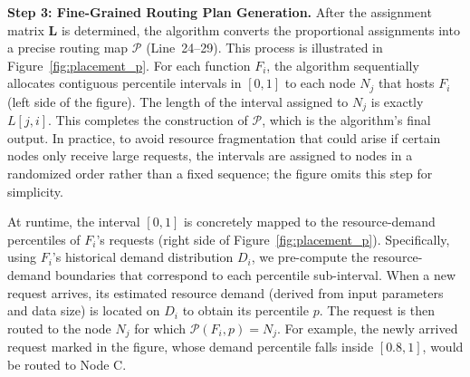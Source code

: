 \textbf{Step 3: Fine-Grained Routing Plan Generation.}
After the assignment matrix $\mathbf{L}$ is determined, the algorithm converts 
the proportional assignments into a precise routing map $\mathcal{P}$ 
(Line~24--29). This process is illustrated in Figure~\ref{fig:placement_p}. 
For each function $F_i$, the algorithm sequentially allocates contiguous percentile 
intervals in $[0, 1]$ to each node $N_j$ that hosts $F_i$ (left side of the figure). 
The length of the interval assigned to $N_j$ is exactly $L[j,i]$. This completes 
the construction of $\mathcal{P}$, which is the algorithm's final output. In 
practice, to avoid resource fragmentation that could arise if certain nodes only 
receive large requests, the intervals are assigned to nodes in a randomized order 
rather than a fixed sequence; the figure omits this step for simplicity.

 At runtime, the interval $[0, 1]$ is concretely mapped 
to the resource-demand percentiles of $F_i$'s requests (right side of 
Figure~\ref{fig:placement_p}). Specifically, using $F_i$'s historical demand 
distribution $D_i$, we pre-compute the resource-demand boundaries that correspond 
to each percentile sub-interval. When a new request arrives, its estimated resource
demand (derived from input parameters and data size) is located on $D_i$ to obtain
its percentile $p$. The request is then routed to the node $N_j$ for which 
$\mathcal{P}(F_i, p) = N_j$. For example, the newly arrived request marked in 
the figure, whose demand percentile falls inside $[0.8, 1]$, would be routed 
to Node C. 

